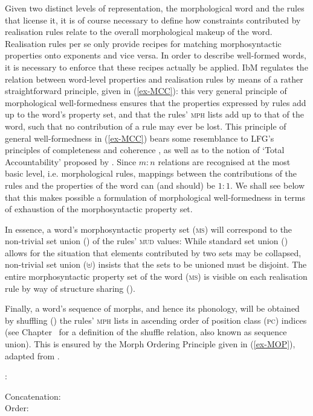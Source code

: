 \documentclass[output=paper
	        ,collection
	        ,collectionchapter
 	        ,biblatex
                ,babelshorthands
                ,newtxmath
                ,draftmode
                ,colorlinks, citecolor=brown
]{langscibook}
\begin{document}
\begin{exe}
\begin{xlist}
Given two distinct levels of representation, the morphological word
and the rules that license it, it is of course necessary to define how
constraints contributed by realisation rules relate to the overall
morphological makeup of the word. Realisation rules per se only
provide recipes for matching morphosyntactic properties onto exponents
and vice versa. In order to describe well-formed words, it is
necessary to enforce that these recipes actually be applied. IbM
regulates the relation between word-level properties and realisation
rules by means of a rather straightforward principle, given in
(\ref{ex-MCC}): this very general principle of morphological
well-formedness ensures that the properties expressed by rules add up
to the word's property set, and that the rules' \textsc{mph} lists add
up to that of the word, such that no contribution of a rule may ever
be lost. This principle of general well-formedness in
(\ref{ex-MCC}) bears some resemblance to LFG's principles of
completeness and coherence \citep{bresnan_j82}, as well as to the
notion of `Total Accountability' proposed by \citet{Hockett47}. Since
$m:n$ relations are recognised at the most basic level,
i.e. morphological rules, mappings between the contributions of the
rules and the properties of the word can (and should) be $1:1$.  We
shall see below that this makes possible a formulation of morphological
well-formedness in terms of exhaustion of the morphosyntactic property
set.

In essence, a word's morphosyntactic property set (\textsc{ms}) will
correspond to the non-trivial set union (\isi{$\uplus$}) of the rules'
\textsc{mud} values: While standard set union (\isi{$\cup$}) allows for the
situation that elements contributed by two sets may be collapsed,
non-trivial set union ($\uplus$) insists that the sets to be unioned
must be disjoint.  The entire morphosyntactic property set of the word
(\textsc{ms}) is visible on each realisation rule by way of structure
sharing ().

Finally, a word's sequence of morphs, and hence its phonology, will
be obtained by shuffling (\isi{$\bigcirc$}) the rules' \textsc{mph} lists in
ascending order of position class (\textsc{pc}) indices (see
Chapter~ for a definition of the shuffle
relation, also known as
sequence union). This is ensured by the Morph
Ordering Principle given in (\ref{ex-MOP}), adapted from
\citet{Crysmann:Bonami:2016}.

\begin{exe}
  \ex\label{ex-MOP}
:
\begin{xlist}
\ex Concatenation:\\
\ex Order:\\
\zl


\end{xlist}
\end{exe}
\end{xlist}
\end{exe}
\end{document}
